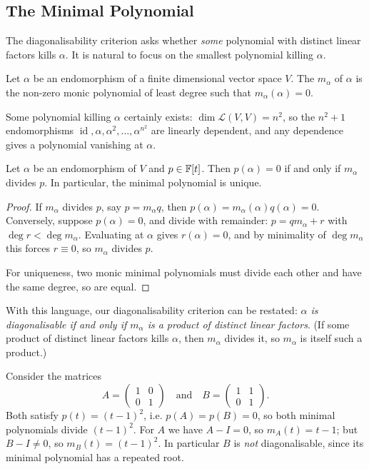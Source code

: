 \documentclass[a4paper]{scrartcl}
\begin{document}
\subsection{The Minimal Polynomial}

The diagonalisability criterion asks whether \emph{some} polynomial with distinct linear factors kills $\alpha$. It is natural to focus on the smallest polynomial killing $\alpha$.

\begin{definition}
    Let $\alpha$ be an endomorphism of a finite dimensional vector space $V$. The  $m_\alpha$ of $\alpha$ is the non-zero monic polynomial of least degree such that $m_\alpha(\alpha) = 0$.
\end{definition}

Some polynomial killing $\alpha$ certainly exists: $\dim \mathcal{L}(V, V) = n^2$, so the $n^2 + 1$ endomorphisms $\operatorname{id}, \alpha, \alpha^2, \dots, \alpha^{n^2}$ are linearly dependent, and any dependence gives a polynomial vanishing at $\alpha$.

\begin{lemma}
    Let $\alpha$ be an endomorphism of $V$ and $p \in \mathbb{F}[t]$. Then $p(\alpha) = 0$ if and only if $m_\alpha$ divides $p$. In particular, the minimal polynomial is unique.
\end{lemma}
\begin{proof}
    If $m_\alpha$ divides $p$, say $p = m_\alpha q$, then $p(\alpha) = m_\alpha(\alpha)q(\alpha) = 0$. Conversely, suppose $p(\alpha) = 0$, and divide with remainder: $p = q m_\alpha + r$ with $\deg r < \deg m_\alpha$. Evaluating at $\alpha$ gives $r(\alpha) = 0$, and by minimality of $\deg m_\alpha$ this forces $r \equiv 0$, so $m_\alpha$ divides $p$.

    For uniqueness, two monic minimal polynomials must divide each other and have the same degree, so are equal.
\end{proof}

With this language, our diagonalisability criterion can be restated: \emph{$\alpha$ is diagonalisable if and only if $m_\alpha$ is a product of distinct linear factors}. (If some product of distinct linear factors kills $\alpha$, then $m_\alpha$ divides it, so $m_\alpha$ is itself such a product.)

\begin{example}
    Consider the matrices
    $$
    A = \begin{pmatrix} 1 & 0 \\ 0 & 1\end{pmatrix} \quad \text{and} \quad B = \begin{pmatrix} 1 & 1 \\ 0 & 1\end{pmatrix}.
    $$
    Both satisfy $p(t) = (t - 1)^2$, i.e. $p(A) = p(B) = 0$, so both minimal polynomials divide $(t-1)^2$. For $A$ we have $A - I = 0$, so $m_A(t) = t - 1$; but $B - I \neq 0$, so $m_B(t) = (t - 1)^2$. In particular $B$ is \emph{not} diagonalisable, since its minimal polynomial has a repeated root.
\end{example}
\end{document}
